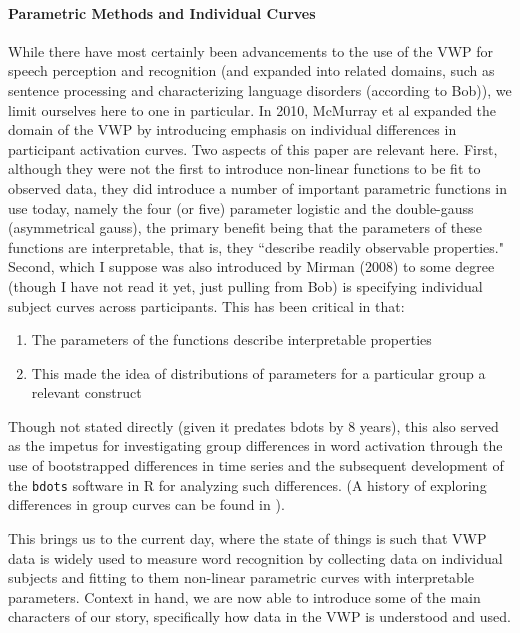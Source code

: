 \documentclass{article}
\newcommand{\xt}{\texttt}%
\begin{document}
\paragraph{Parametric Methods and Individual Curves} While there have most certainly been advancements to the use of the VWP for speech perception and recognition (and expanded into related domains, such as sentence processing and characterizing language disorders (according to Bob)), we  limit ourselves here to one in particular. In 2010, McMurray et al expanded the domain of the VWP by introducing emphasis on individual differences in participant activation curves. Two aspects of this paper are relevant here. First, although they were not the first to introduce non-linear functions to be fit to observed data, they did introduce a number of important parametric functions in use today, namely the four (or five) parameter logistic and the double-gauss (asymmetrical gauss), the primary benefit being that the parameters of these functions are interpretable, that is, they ``describe readily observable properties." Second, which I suppose was also introduced by Mirman (2008) \cite{Mirman2008} to some degree (though I have not read it yet, just pulling from Bob) is specifying individual subject curves across participants. This has been critical in that:

\begin{singlespace}
\begin{enumerate}
\vspace{-3mm}
\item The parameters of the functions describe interpretable properties
\item This made the idea of distributions of parameters for a particular group a relevant construct
\end{enumerate}
\end{singlespace}

Though not stated directly (given it predates bdots by 8 years), this also served as the impetus for investigating group differences in word activation through the use of bootstrapped differences in time series \cite{oleson2017detecting} and the subsequent development of the \xt{bdots} software in R for analyzing such differences. (A history of exploring differences in group curves can be found in \cite{seedorff2018bdots}).

This brings us to the current day, where the state of things is such that VWP data is widely used to measure word recognition by collecting data on individual subjects and fitting to them non-linear parametric curves with interpretable parameters. Context in hand, we are now able to introduce some of the main characters of our story, specifically how data in the VWP is understood and used. 
\end{document}
